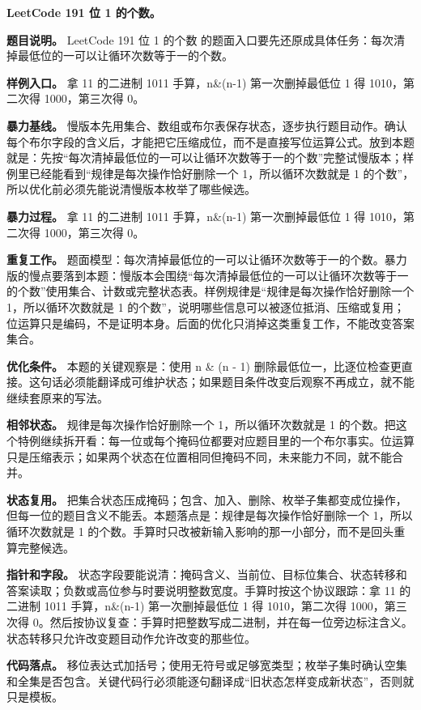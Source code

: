 \noindent\textbf{LeetCode 191 位 1 的个数。}

\textbf{题目说明。} LeetCode 191 位 1 的个数 的题面入口要先还原成具体任务：每次清掉最低位的一可以让循环次数等于一的个数。

\textbf{样例入口。} 拿 11 的二进制 1011 手算，n\&(n-1) 第一次删掉最低位 1 得 1010，第二次得 1000，第三次得 0。

\textbf{暴力基线。} 慢版本先用集合、数组或布尔表保存状态，逐步执行题目动作。确认每个布尔字段的含义后，才能把它压缩成位，而不是直接写位运算公式。放到本题就是：先按“每次清掉最低位的一可以让循环次数等于一的个数”完整试慢版本；样例里已经能看到“规律是每次操作恰好删除一个 1，所以循环次数就是 1 的个数”，所以优化前必须先能说清慢版本枚举了哪些候选。

\textbf{暴力过程。} 拿 11 的二进制 1011 手算，n\&(n-1) 第一次删掉最低位 1 得 1010，第二次得 1000，第三次得 0。

\textbf{重复工作。} 题面模型：每次清掉最低位的一可以让循环次数等于一的个数。暴力版的慢点要落到本题：慢版本会围绕“每次清掉最低位的一可以让循环次数等于一的个数”使用集合、计数或完整状态表。样例规律是“规律是每次操作恰好删除一个 1，所以循环次数就是 1 的个数”，说明哪些信息可以被逐位抵消、压缩或复用；位运算只是编码，不是证明本身。后面的优化只消掉这类重复工作，不能改变答案集合。

\textbf{优化条件。} 本题的关键观察是：使用 n \& (n - 1) 删除最低位一，比逐位检查更直接。这句话必须能翻译成可维护状态；如果题目条件改变后观察不再成立，就不能继续套原来的写法。

\textbf{相邻状态。} 规律是每次操作恰好删除一个 1，所以循环次数就是 1 的个数。把这个特例继续拆开看：每一位或每个掩码位都要对应题目里的一个布尔事实。位运算只是压缩表示；如果两个状态在位置相同但掩码不同，未来能力不同，就不能合并。

\textbf{状态复用。} 把集合状态压成掩码；包含、加入、删除、枚举子集都变成位操作，但每一位的题目含义不能丢。本题落点是：规律是每次操作恰好删除一个 1，所以循环次数就是 1 的个数。手算时只改被新输入影响的那一小部分，而不是回头重算完整候选。

\textbf{指针和字段。} 状态字段要能说清：掩码含义、当前位、目标位集合、状态转移和答案读取；负数或高位参与时要说明整数宽度。手算时按这个协议跟踪：拿 11 的二进制 1011 手算，n\&(n-1) 第一次删掉最低位 1 得 1010，第二次得 1000，第三次得 0。然后按协议复查：手算时把整数写成二进制，并在每一位旁边标注含义。状态转移只允许改变题目动作允许改变的那些位。

\textbf{代码落点。} 移位表达式加括号；使用无符号或足够宽类型；枚举子集时确认空集和全集是否包含。关键代码行必须能逐句翻译成“旧状态怎样变成新状态”，否则就只是模板。

